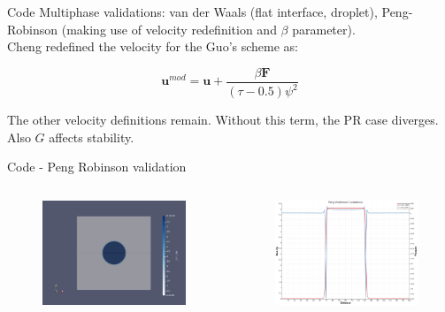 \documentclass[8pt]{beamer}
\begin{document}
	\begin{frame}{Code}
		Multiphase validations: van der Waals (flat interface, droplet), Peng-Robinson (making use of velocity redefinition and $\beta$ parameter).\\
		Cheng redefined the velocity for the Guo's scheme as:
		
		\begin{equation}
			\mathbf{u}^{mod} = \mathbf{u} + \frac{\beta \mathbf{F}}{(\tau - 0.5)\psi^2}
		\end{equation}
		
		The other velocity definitions remain. Without this term, the PR case diverges. Also $G$ affects stability.
		
	\end{frame}
	
	\begin{frame}{Code - Peng Robinson validation}
		\begin{columns}
			\begin{figure}
				\centering
				\includegraphics[scale=0.12]{pics/prDroplet1C.png}
				\caption{}   
			\end{figure}
			\begin{figure}
				\centering
				\includegraphics[scale=0.15]{pics/prDroplet1C_2.png}
			\end{figure}
		\end{columns}
	\end{frame}
	
\end{document}
